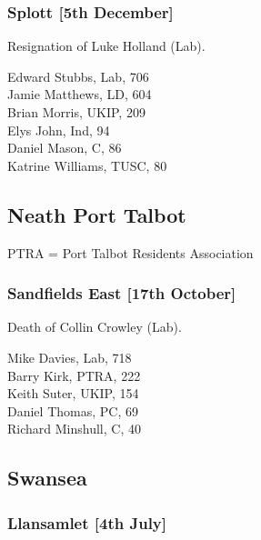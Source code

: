 \documentclass[a4paper,openany,10pt]{book}
\begin{document}
\subsubsection*{Splott \hspace*{\fill}\nolinebreak[1]%
\enspace\hspace*{\fill}
[5th December]}


Resignation of Luke Holland (Lab).



Edward Stubbs, Lab, 706\\
Jamie Matthews, LD, 604\\
Brian Morris, UKIP, 209\\
Elys John, Ind, 94\\
Daniel Mason, C, 86\\
Katrine Williams, TUSC, 80\\


\subsection*{Neath Port Talbot}

PTRA = Port Talbot Residents Association

\subsubsection*{Sandfields East \hspace*{\fill}\nolinebreak[1]%
\enspace\hspace*{\fill}
[17th October]}


Death of Collin Crowley (Lab).



Mike Davies, Lab, 718\\
Barry Kirk, PTRA, 222\\
Keith Suter, UKIP, 154\\
Daniel Thomas, PC, 69\\
Richard Minshull, C, 40\\


\subsection*{Swansea}

\subsubsection*{Llansamlet \hspace*{\fill}\nolinebreak[1]%
\enspace\hspace*{\fill}
[4th July]}
\end{document}
